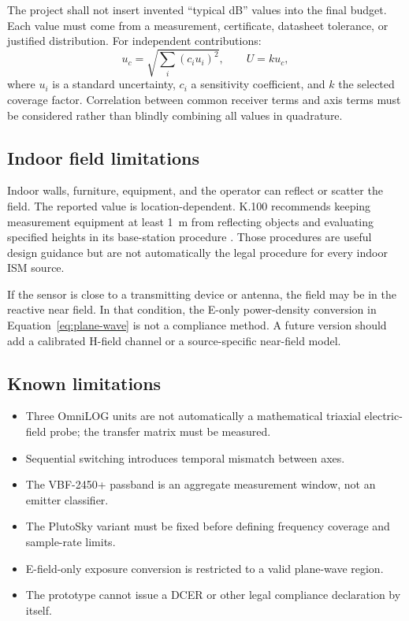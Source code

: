\documentclass[11pt,a4paper]{article}
\begin{document}
The project shall not insert invented ``typical dB'' values into the final budget. Each value must come from a measurement, certificate, datasheet tolerance, or justified distribution. For independent contributions:
\begin{equation}
  u_c=\sqrt{\sum_i(c_i u_i)^2},
  \qquad U=k u_c,
  \label{eq:uncertainty}
\end{equation}
where $u_i$ is a standard uncertainty, $c_i$ a sensitivity coefficient, and $k$ the selected coverage factor. Correlation between common receiver terms and axis terms must be considered rather than blindly combining all values in quadrature.

\subsection{Indoor field limitations}
Indoor walls, furniture, equipment, and the operator can reflect or scatter the field. The reported value is location-dependent. K.100 recommends keeping measurement equipment at least 1~m from reflecting objects and evaluating specified heights in its base-station procedure \cite[Sec.~9.4]{ITU-T-K.100}. Those procedures are useful design guidance but are not automatically the legal procedure for every indoor ISM source.

If the sensor is close to a transmitting device or antenna, the field may be in the reactive near field. In that condition, the E-only power-density conversion in Equation~\ref{eq:plane-wave} is not a compliance method. A future version should add a calibrated H-field channel or a source-specific near-field model.

\subsection{Known limitations}
\begin{itemize}
  \item Three OmniLOG units are not automatically a mathematical triaxial electric-field probe; the transfer matrix must be measured.
  \item Sequential switching introduces temporal mismatch between axes.
  \item The VBF-2450+ passband is an aggregate measurement window, not an emitter classifier.
  \item The PlutoSky variant must be fixed before defining frequency coverage and sample-rate limits.
  \item E-field-only exposure conversion is restricted to a valid plane-wave region.
  \item The prototype cannot issue a DCER or other legal compliance declaration by itself.
\end{itemize}
\end{document}
